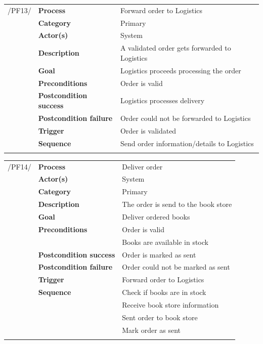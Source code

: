 \documentclass[11pt,a4paper,oneside,svgnames]{report}
\begin{document}
\noindent
\begin{tabular}{p{1.5cm}p{3cm}p{8cm}}
\cellcolor{white}	 /PF13/	& \textbf{Process} & Forward order to Logistics\\ 
\cellcolor{white}		& \textbf{Category} & Primary\\
\cellcolor{white}		& \textbf{Actor(s)} & System\\ 
\cellcolor{white}		& \textbf{Description}	 & A validated order gets forwarded to Logistics\\ 
\cellcolor{white}		& \textbf{Goal} & Logistics proceeds processing the order\\
\cellcolor{white}		& \textbf{Preconditions} & Order is valid\\
\cellcolor{white}		& \textbf{Postcondition success} & Logistics processes delivery\\
\cellcolor{white}		& \textbf{Postcondition failure} & Order could not be forwarded to Logistics\\
\cellcolor{white}		& \textbf{Trigger} & Order is validated\\
\cellcolor{white}		& \textbf{Sequence} & Send order information/details to Logistics\\
\cellcolor{white}\hfill \\
\end{tabular}

\noindent
\begin{tabular}{p{1.5cm}p{3cm}p{8cm}}
\cellcolor{white}/PF14/	& \textbf{Process} & Deliver order\\
\cellcolor{white}		& \textbf{Actor(s)} & System\\
\cellcolor{white}		& \textbf{Category} & Primary\\
\cellcolor{white}		& \textbf{Description}	 &  The order is send to the book store\\
\cellcolor{white}		& \textbf{Goal} & Deliver ordered books\\
\cellcolor{white}		& \textbf{Preconditions} & Order is valid\\
\cellcolor{white}		& & Books are available in stock\\
\cellcolor{white}		& \textbf{Postcondition success} & Order is marked as sent\\
\cellcolor{white}		& \textbf{Postcondition failure} & Order could not be marked as sent\\
\cellcolor{white}		& \textbf{Trigger} & Forward order to Logistics\\
\cellcolor{white}		& \textbf{Sequence} & Check if books are in stock\\
\cellcolor{white}		& & Receive book store information\\
\cellcolor{white}		& & Sent order to book store\\
\cellcolor{white}		& & Mark order as sent\\
\cellcolor{white}\hfill \\
\end{tabular}
\end{document}

